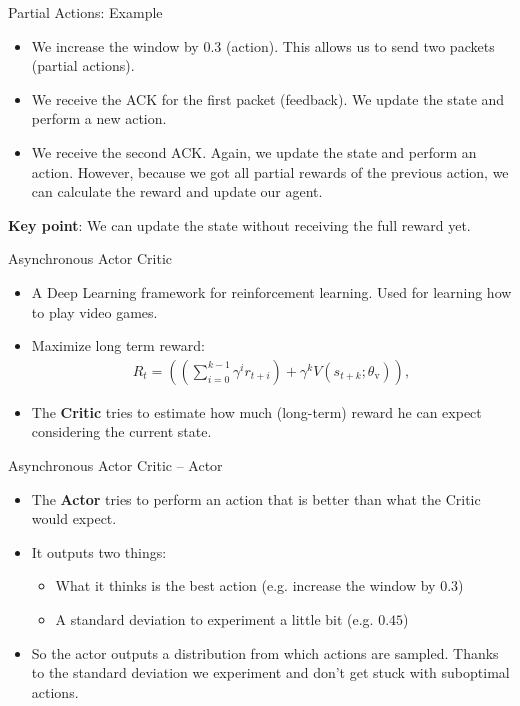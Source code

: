 \documentclass[11pt]{beamer}
\begin{document}
\begin{frame}{Partial Actions: Example}
\begin{itemize}
\item We increase the window by $0.3$ (action). This allows us to send two packets (partial actions).  
\item We receive the ACK for the first packet (feedback). We update the state and perform a new action.
\item We receive the second ACK. Again, we update the state and perform an action. However, because we got all partial rewards of the previous action, we can calculate the reward and update our agent.
\end{itemize}
\textbf{Key point}: We can update the state without receiving the full reward yet.
\end{frame}

\begin{frame}{Asynchronous Actor Critic}
\begin{itemize}
\item A Deep Learning framework for reinforcement learning. Used for learning how to play video games.
\item Maximize long term reward: \begin{align*}
R_t = \left(\left(\sum_{i=0}^{k-1} \gamma^ir_{t+i}\right) + \gamma^k V(s_{t+k}; \theta_\text{v})\right),
\end{align*}
\item The \textbf{Critic} tries to estimate how much (long-term) reward he can expect considering the current state.
\end{itemize}
\end{frame}

\begin{frame}{Asynchronous Actor Critic -- Actor}
\begin{itemize}
\item The \textbf{Actor} tries to perform an action that is better than what the Critic would expect.
\item It outputs two things:
\begin{itemize}
\item What it thinks is the best action (e.g. increase the window by $0.3$)
\item A standard deviation to experiment a little bit (e.g. $0.45$)
\end{itemize}
\item So the actor outputs a distribution from which actions are sampled. Thanks to the standard deviation we experiment and don't get stuck with suboptimal actions. 
\end{itemize}
\end{frame}
\end{document}
